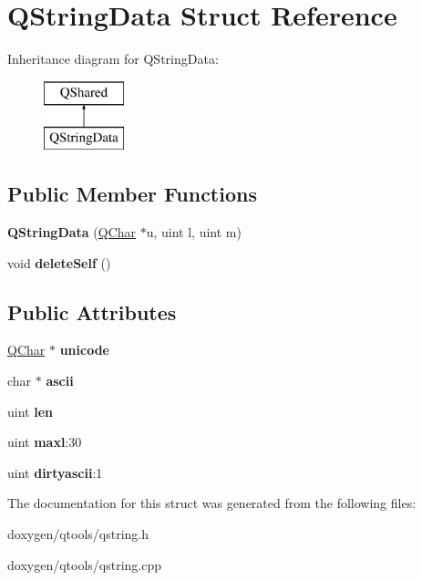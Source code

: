 \hypertarget{struct_q_string_data}{}\section{Q\+String\+Data Struct Reference}
\label{struct_q_string_data}
Inheritance diagram for Q\+String\+Data\+:\begin{figure}[H]
\begin{center}
\leavevmode
\includegraphics[height=2.000000cm]{struct_q_string_data}
\end{center}
\end{figure}
\subsection*{Public Member Functions}
\begin{DoxyCompactItemize}
\item 
\mbox{\label{struct_q_string_data_a03eb4ed3d4573f936840f280c5240038}} 
{\bfseries Q\+String\+Data} (\mbox{\hyperlink{class_q_char}{Q\+Char}} $\ast$u, uint l, uint m)
\item 
\mbox{\label{struct_q_string_data_a06038637d9d1d7cd66a6dcea326ed728}} 
void {\bfseries delete\+Self} ()
\end{DoxyCompactItemize}
\subsection*{Public Attributes}
\begin{DoxyCompactItemize}
\item 
\mbox{\label{struct_q_string_data_ad7797dad5e9a1a63a3f21025f32331d0}} 
\mbox{\hyperlink{class_q_char}{Q\+Char}} $\ast$ {\bfseries unicode}
\item 
\mbox{\label{struct_q_string_data_abfc6719543722e9e8b6dee0cafdc506c}} 
char $\ast$ {\bfseries ascii}
\item 
\mbox{\label{struct_q_string_data_a53835c385536b0285210dce78c256568}} 
uint {\bfseries len}
\item 
\mbox{\label{struct_q_string_data_ae8b44ff3a52935f9460fdaacaa92fd4e}} 
uint {\bfseries maxl}\+:30
\item 
\mbox{\label{struct_q_string_data_ab8a58a2bd4e619f151e59aff14c75d54}} 
uint {\bfseries dirtyascii}\+:1
\end{DoxyCompactItemize}


The documentation for this struct was generated from the following files\+:\begin{DoxyCompactItemize}
\item 
doxygen/qtools/qstring.\+h\item 
doxygen/qtools/qstring.\+cpp\end{DoxyCompactItemize}
